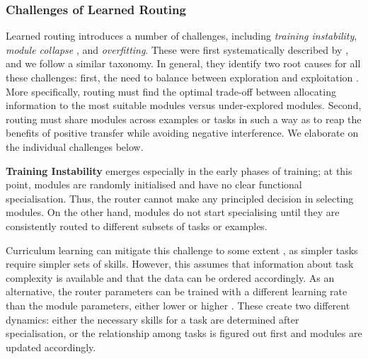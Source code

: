 \documentclass[10pt]{article} %
\begin{document}
\subsubsection{Challenges of Learned Routing}
\label{ssec:challenges_routing}
Learned routing introduces a number of challenges, including
\textit{training instability}, \textit{module collapse} \citep{kirsch2018modular}, and \textit{overfitting}. These were first systematically described by \citet{rosenbaum2019routing}, and we follow a similar taxonomy. In general, they identify two root causes for all these challenges: first, the need to balance between exploration and exploitation \citep{sutton1986two}. More specifically, routing must find the optimal trade-off between allocating information to the most suitable modules versus under-explored modules. Second, routing must share modules across examples or tasks in such a way as to reap the benefits of positive transfer while avoiding negative interference. We elaborate on the individual challenges below.

\textbf{Training Instability} emerges especially in the early phases of training; at this point, modules are randomly initialised and have no clear functional specialisation. Thus, the router cannot make any principled decision in selecting modules. On the other hand, modules do not start specialising until they are consistently routed to different subsets of tasks or examples.

Curriculum learning can mitigate this challenge to some extent \citep{chang2018automatically}, as simpler tasks require simpler sets of skills. However, this assumes that information about task complexity is available and that the data can be ordered accordingly. As an alternative, the router parameters can be trained with a different learning rate than the module parameters, either lower \citep{rosenbaum2017routing} or higher \citep{ponti2022combining}. These create two different dynamics: either the necessary skills for a task are determined after specialisation, or the relationship among tasks is figured out first and modules are updated accordingly. 
\end{document}
